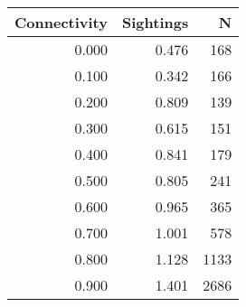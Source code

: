 \begin{tabular}{rrr}
\toprule
 Connectivity &  Sightings &    N \\
\midrule
        0.000 &      0.476 &  168 \\
        0.100 &      0.342 &  166 \\
        0.200 &      0.809 &  139 \\
        0.300 &      0.615 &  151 \\
        0.400 &      0.841 &  179 \\
        0.500 &      0.805 &  241 \\
        0.600 &      0.965 &  365 \\
        0.700 &      1.001 &  578 \\
        0.800 &      1.128 & 1133 \\
        0.900 &      1.401 & 2686 \\
\bottomrule
\end{tabular}
